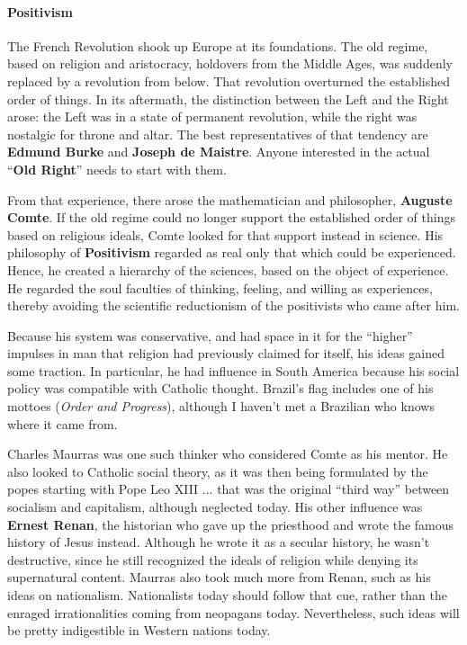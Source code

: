 \paragraph{Positivism}


The French Revolution shook up Europe at its foundations. The old regime, based on religion and aristocracy, holdovers from the Middle Ages, was suddenly replaced by a revolution from below. That revolution overturned the established order of things. In its aftermath, the distinction between the Left and the Right arose: the Left was in a state of permanent revolution, while the right was nostalgic for throne and altar. The best representatives of that tendency are \textbf{Edmund Burke} and \textbf{Joseph de Maistre}. Anyone interested in the actual ``\textbf{Old Right}'' needs to start with them.

From that experience, there arose the mathematician and philosopher, \textbf{Auguste Comte}. If the old regime could no longer support the established order of things based on religious ideals, Comte looked for that support instead in science. His philosophy of \textbf{Positivism} regarded as real only that which could be experienced. Hence, he created a hierarchy of the sciences, based on the object of experience. He regarded the soul faculties of thinking, feeling, and willing as experiences, thereby avoiding the scientific reductionism of the positivists who came after him.

Because his system was conservative, and had space in it for the ``higher'' impulses in man that religion had previously claimed for itself, his ideas gained some traction. In particular, he had influence in South America because his social policy was compatible with Catholic thought. Brazil's flag includes one of his mottoes (\emph{Order and Progress}), although I haven't met a Brazilian who knows where it came from.

Charles Maurras was one such thinker who considered Comte as his mentor. He also looked to Catholic social theory, as it was then being formulated by the popes starting with Pope Leo XIII ... that was the original ``third way'' between socialism and capitalism, although neglected today. His other influence was \textbf{Ernest Renan}, the historian who gave up the priesthood and wrote the famous history of Jesus instead. Although he wrote it as a secular history, he wasn't destructive, since he still recognized the ideals of religion while denying its supernatural content. Maurras also took much more from Renan, such as his ideas on nationalism. Nationalists today should follow that cue, rather than the enraged irrationalities coming from neopagans today. Nevertheless, such ideas will be pretty indigestible in Western nations today.

